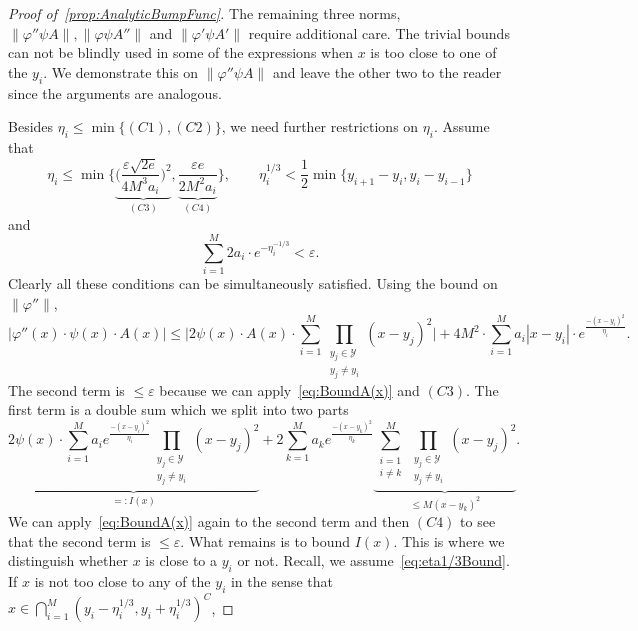 \documentclass[11pt,]{article}
\def\cref#1{\ref{#1}}%
\theoremstyle{definition}
\theoremstyle{remark}
\newcommand{\0}{\mathbf{0}}
\begin{document}
\begin{proof}[Proof of~\cref{prop:AnalyticBumpFunc}]
The remaining three norms, $\|\varphi'' \psi A\|,\|\varphi \psi A''\|$ and $\|\varphi' \psi A'\|$
require additional care. The trivial bounds can not be blindly used in some of the expressions when
$x$ is too close to one of the $y_i$. We demonstrate this on $\|\varphi'' \psi A\|$ and leave the
other two to the reader since the arguments are analogous.

Besides $\eta_i\leq\min\{(C1),(C2)\}$, we need further restrictions on $\eta_i$. Assume that
\begin{equation}\label{eq:eta1/3Bound}
	\eta_i\leq \min \bigg\{ \underbrace{ \Big( \frac{\varepsilon\sqrt{2e}}{4M^3a_i} \Big)^2
	}_{(C3)}, \underbrace{ \frac{\varepsilon e}{2M^2a_i} }_{(C4)} \bigg\},\qquad
	\eta_i^{1/3} < \frac{1}{2} \min\big\{ y_{i+1}-y_i, y_i-y_{i-1} \big\} 
\end{equation}
and
\begin{equation}\label{eq:etaOtherBound}
	\sum_{i=1}^M 2a_i\cdot e^{-\eta_i^{-1/3}} < \varepsilon.
\end{equation}
Clearly all these conditions can be simultaneously satisfied. Using the bound on $\|\varphi''\|$,
\begin{equation*}
	\big|\varphi''(x)\cdot \psi(x)\cdot A(x)\big|\leq  \bigg| 2\psi(x)\cdot A(x)\cdot
	\sum_{i=1}^{M}  \prod_{\substack{y_j\in\mathcal{Y}\\ y_j\neq y_i}} (x-y_j)^2 \bigg| +
	4M^2\cdot \sum_{i=1}^{M} a_i|x-y_i| \cdot e^{\frac{-(x-y_i)^2}{\eta_i}}.
\end{equation*}
The second term is $\leq \varepsilon$ because we can apply~\cref{eq:BoundA(x)} and $(C3)$. The first
term is a double sum which we split into two parts
\begin{equation*}
	\underbrace{2\psi(x)\cdot  \sum_{i=1}^{M} a_i e^{\frac{-(x-y_i)^2}{\eta_i}}
	\prod_{\substack{y_j\in\mathcal{Y}\\ y_j\neq y_i}} (x-y_j)^2}_{=: I(x)} +
	2 \sum_{k=1}^{M}  a_k  e^{\frac{-(x-y_k)^2}{\eta_k}} \underbrace{\sum_{\substack{i=1 \\
	i\neq k}}^{M} \prod_{\substack{y_j\in\mathcal{Y}\\ y_j\neq y_i}} (x-y_j)^2}_{\leq
      M(x-y_k)^2}.
\end{equation*} 
We can apply~\cref{eq:BoundA(x)} again to the second term and then $(C4)$ to see that the second
term is $\leq \varepsilon$. What remains is to bound $I(x)$. This is where we distinguish whether
$x$ is close to a $y_i$ or not. Recall, we assume~\cref{eq:eta1/3Bound}. If $x$ is not too close to
any of the $y_i$ in the sense that $x\in\bigcap_{i=1}^M (y_i-\eta_i^{1/3}, y_i+\eta_i^{1/3})^C$,

\end{proof}
\end{document}
